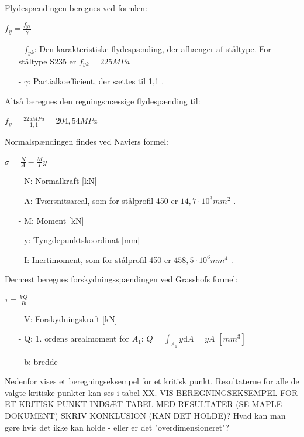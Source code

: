 Flydespændingen beregnes ved formlen:

\begin{center}
	$f_y = \frac{f_{yk}}{\gamma}$
\end{center}

\begin{itemize}
	\item[-] $f_{yk}$: Den karakteristiske flydespænding, der afhænger af ståltype. For ståltype S235 er $f_{yk} = 225 MPa$
	\item[-] $\gamma$: Partialkoefficient, der sættes til 1,1 \citep[ s. 212]{stabi}.  
\end{itemize}

Altså beregnes den regningsmæssige flydespænding til:

\begin{center}
	$f_y = \frac{225 MPa}{1,\!1} = 204,\!54 MPa$
\end{center}

Normalspændingen findes ved Naviers formel:

\begin{center}
	$\sigma = \frac{N}{A} - \frac{M}{I} y$
\end{center}

\begin{itemize}
	\item[-] N: Normalkraft [kN]
	\item[-] A: Tværsnitsareal, som for stålprofil 450 er $14,\!7 \cdot 10^3 mm^2$ \citep{stabi}. 
	\item[-] M: Moment [kN]
	\item[-] y: Tyngdepunktskoordinat [mm]
	\item[-] I: Inertimoment, som for stålprofil 450 er $458,\!5 \cdot 10^6 mm^4$ \citep{stabi}. 
\end{itemize} 

Dernæst beregnes forskydningsspændingen ved Grasshofs formel:

\begin{center}
	$\tau = \frac{VQ}{Ib}$
\end{center}

\begin{itemize}
	\item[-] V: Forskydningskraft [kN]
	\item[-] Q: 1. ordens arealmoment for $A_1$: $Q = \int_{A_1}y \mathrm{d}A = yA$ $[mm^3]$
	\item[-] b: bredde
\end{itemize}

Nedenfor vises et beregningseksempel for et kritisk punkt. Resultaterne for alle de valgte kritiske punkter kan ses i tabel XX. 
\newline
\newline
VIS BEREGNINGSEKSEMPEL FOR ET KRITISK PUNKT
\newline
\newline
INDSÆT TABEL MED RESULTATER (SE MAPLE-DOKUMENT) 
\newline
\newline
SKRIV KONKLUSION (KAN DET HOLDE)? Hvad kan man gøre hvis det ikke kan holde - eller er det "overdimensioneret"?